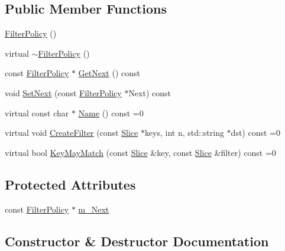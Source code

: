 \subsection*{Public Member Functions}
\begin{DoxyCompactItemize}
\item 
\hyperlink{classleveldb_1_1_filter_policy_abdc8b68ff39702b177db5c391ce96e11}{Filter\+Policy} ()
\item 
virtual \hyperlink{classleveldb_1_1_filter_policy_a4134b35d7dd640c7c6f182bf7305f158}{$\sim$\+Filter\+Policy} ()
\item 
const \hyperlink{classleveldb_1_1_filter_policy}{Filter\+Policy} $\ast$ \hyperlink{classleveldb_1_1_filter_policy_a624a686d931d0b8fabb887fc6389f63b}{Get\+Next} () const 
\item 
void \hyperlink{classleveldb_1_1_filter_policy_a2e8d740d77a0714c97e40e674ac31ce2}{Set\+Next} (const \hyperlink{classleveldb_1_1_filter_policy}{Filter\+Policy} $\ast$Next) const 
\item 
virtual const char $\ast$ \hyperlink{classleveldb_1_1_filter_policy_afd5e951892a2e740f186c0658913ea1b}{Name} () const =0
\item 
virtual void \hyperlink{classleveldb_1_1_filter_policy_a355e9797e16dd16b93d19056781126b2}{Create\+Filter} (const \hyperlink{classleveldb_1_1_slice}{Slice} $\ast$keys, int n, std\+::string $\ast$dst) const =0
\item 
virtual bool \hyperlink{classleveldb_1_1_filter_policy_a6f8ba10ea25e0b4b8d0a6607c361c718}{Key\+May\+Match} (const \hyperlink{classleveldb_1_1_slice}{Slice} \&key, const \hyperlink{classleveldb_1_1_slice}{Slice} \&filter) const =0
\end{DoxyCompactItemize}
\subsection*{Protected Attributes}
\begin{DoxyCompactItemize}
\item 
const \hyperlink{classleveldb_1_1_filter_policy}{Filter\+Policy} $\ast$ \hyperlink{classleveldb_1_1_filter_policy_ad2ef342ab69176b26ea0aa0be48bd691}{m\+\_\+\+Next}
\end{DoxyCompactItemize}


\subsection{Constructor \& Destructor Documentation}
\hypertarget{classleveldb_1_1_filter_policy_abdc8b68ff39702b177db5c391ce96e11}{}
